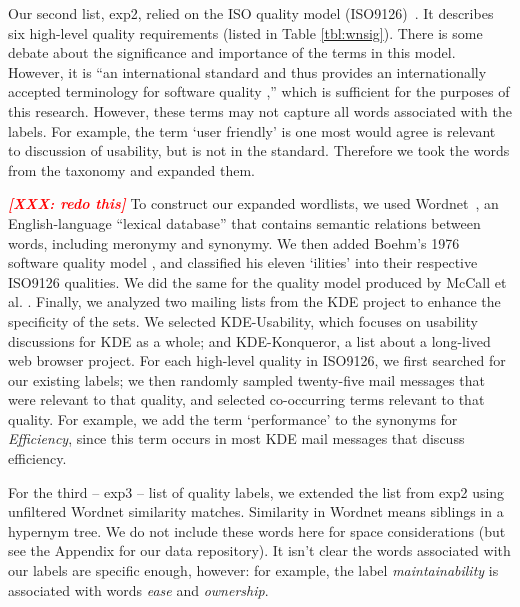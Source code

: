 \documentclass{acm_proc_article-sp}
\newcommand{\XXX}[1]{\textcolor{red}{{\it \textbf{[XXX: #1]}}}}
\begin{document}
Our second list, \textsf{exp2}, relied on the ISO quality model (ISO9126)~\cite{iso9126}. It describes six high-level quality requirements (listed in Table \ref{tbl:wnsig}). There is some debate about the significance and importance of the terms in this model. However, it is ``an international standard and thus provides an internationally accepted terminology for software quality \cite[p. 58]{Bøegh2008},'' which is sufficient for the purposes of this research. However, these terms may not capture all words associated with the labels.  For example, the term ‘user friendly’ is one most would agree is relevant to discussion of usability, but is not in the standard. Therefore we took the words from the taxonomy and expanded them.


\XXX{redo this}
To construct our expanded wordlists, we used Wordnet~\cite{Fellbaum1998}, an English-language ``lexical database'' that contains semantic relations between words, including meronymy and synonymy. We then added Boehm’s 1976 software quality model \cite{Boehm+:1976:ICSE}, and classified his eleven ‘ilities’ into their respective ISO9126 qualities. We did the same for the quality model produced by McCall et al. \cite{mccall1977}. Finally, we analyzed two mailing lists from the KDE project to enhance the specificity of the sets. We selected KDE-Usability, which focuses on usability discussions for KDE as a whole; and KDE-Konqueror, a list about a long-lived web browser project. For each high-level quality in ISO9126, we first searched for our existing labels; we then randomly sampled twenty-five mail messages that were relevant to that quality, and selected co-occurring terms relevant to that quality. For example, we add the term ‘performance’ to the synonyms for \emph{Efficiency}, since this term occurs in most KDE mail messages that discuss efficiency.

For the third -- \textsf{exp3} -- list of quality labels, we extended the list from \textsf{exp2} using unfiltered Wordnet similarity matches. Similarity in Wordnet means siblings in a hypernym tree. We do not include these words here for space considerations (but see the Appendix for our data repository). It isn't clear the words associated with our labels are specific enough, however: for example, the label \emph{maintainability} is associated with words \emph{ease} and \emph{ownership}.
\end{document}
